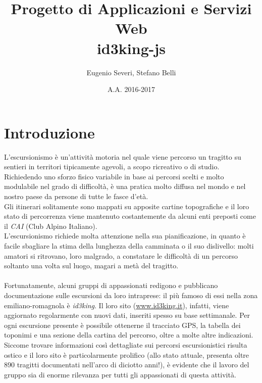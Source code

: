 \documentclass[11pt]{report}
\begin{document}
\title{Progetto di Applicazioni e Servizi Web\\id3king-js}
\author{Eugenio Severi, Stefano Belli}
\date{A.A. 2016-2017}
\begin{titlepage}
	\maketitle
\end{titlepage}

\setcounter{chapter}{1}
\section{Introduzione}
L'escursionismo è un'attività motoria nel quale viene percorso un tragitto su sentieri in territori tipicamente agevoli, a scopo ricreativo o di studio.
\\Richiedendo uno sforzo fisico variabile in base ai percorsi scelti e molto modulabile nel grado di difficoltà, è una pratica molto diffusa nel mondo e nel nostro paese da persone di tutte le fasce d'età.
\\Gli itinerari solitamente sono mappati su apposite cartine topografiche e il loro stato di percorrenza viene mantenuto costantemente da alcuni enti preposti come il \textit{CAI} (Club Alpino Italiano).
\\L'escursionismo richiede molta attenzione nella sua pianificazione, in quanto è facile sbagliare la stima della lunghezza della camminata o il suo dislivello:
molti amatori si ritrovano, loro malgrado, a constatare le difficoltà di un percorso soltanto una volta sul luogo, magari a metà del tragitto.
\\\\Fortunatamente, alcuni gruppi di appassionati redigono e pubblicano documentazione sulle escursioni da loro intraprese: il più famoso di essi nella zona emiliano-romagnola è \textit{id3king}.
Il loro sito (\url{www.id3king.it}), infatti, viene aggiornato regolarmente con nuovi dati, inseriti spesso su base settimanale.
Per ogni escursione presente è possibile ottenerne il tracciato GPS, la tabella dei toponimi e una sezione della cartina del percorso, oltre a molte altre indicazioni.
\\Siccome trovare informazioni così dettagliate sui percorsi escursionistici risulta ostico e il loro sito è particolarmente prolifico (allo stato attuale, presenta oltre 890 tragitti documentati nell'arco di diciotto anni!), è evidente che il lavoro del gruppo sia di enorme rilevanza per tutti gli appassionati di questa attività.
\end{document}
